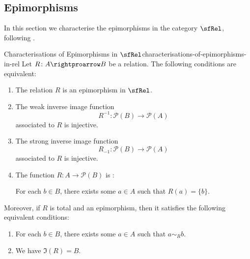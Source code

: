 \subsection{Epimorphisms}\label{subsection-epimorphisms-in-rel}
In this section we characterise the epimorphisms in the category $\sfRel$, following .
\begin{proposition}{Characterisations of Epimorphisms in $\sfRel$}{characterisations-of-epimorphisms-in-rel}%
    Let $R\colon A\rightproarrow B$ be a relation. The following conditions are equivalent:
    \begin{enumerate}
        \item\label{characterisations-of-epimorphisms-in-rel-1}The relation $R$ is an epimorphism in $\sfRel$.
        \item\label{characterisations-of-epimorphisms-in-rel-2}The weak inverse image function
            \[
                R^{-1}%
                \colon%
                \mathcal{P}(B)%
                \to%
                \mathcal{P}(A)%
            \]%
            associated to $R$ is injective.
        \item\label{characterisations-of-epimorphisms-in-rel-3}The strong inverse image function
            \[
                R_{-1}%
                \colon%
                \mathcal{P}(B)%
                \to%
                \mathcal{P}(A)%
            \]%
            associated to $R$ is injective.
        \item\label{characterisations-of-epimorphisms-in-rel-4}The function $R\colon A\to\mathcal{P}(B)$ is :
            \begin{itemize}
                \itemstar For each $b\in B$, there exists some $a\in A$ such that $R(a)=\{b\}$.
            \end{itemize}
    \end{enumerate}
    Moreover, if $R$ is total and an epimorphism, then it satisfies the following equivalent conditions:
    \begin{enumerate}
        \item\label{characterisations-of-epimorphisms-in-rel-5}For each $b\in B$, there exists some $a\in A$ such that $a\sim_{R}b$.
        \item\label{characterisations-of-epimorphisms-in-rel-6}We have $\Im(R)=B$.
    \end{enumerate}
\end{proposition}
